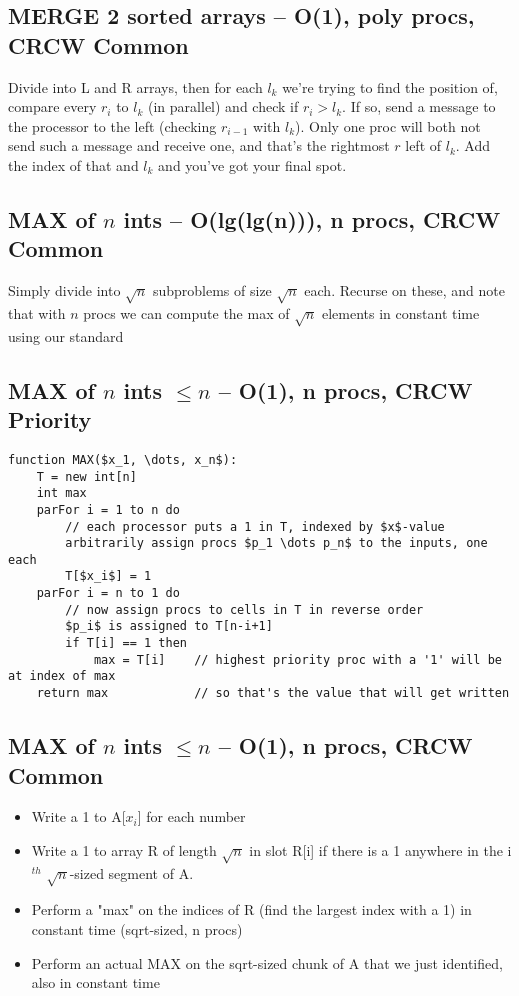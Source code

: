 \documentclass[12pt]{article}
\begin{document}
\subsection{MERGE 2 sorted arrays -- O(1), poly procs, CRCW Common}
Divide into L and R arrays, then for each $l_k$ we're trying to find the position of,
compare every $r_i$ to $l_k$ (in parallel) and check if $r_i > l_k$. If so, send a message
to the processor to the left (checking $r_{i-1}$ with $l_k$). Only one proc will both not send
such a message and receive one, and that's the rightmost $r$ left of $l_k$. Add the index of that
and $l_k$ and you've got your final spot.


\subsection{MAX of $n$ ints -- O(lg(lg(n))), n procs, CRCW Common}
Simply divide into $\sqrt{n}$ subproblems of size $\sqrt{n}$ each. Recurse on these, and note that with $n$ procs
we can compute the max of $\sqrt{n}$ elements in constant time using our standard

\subsection{MAX of $n$ ints $\leq n$ -- O(1), n procs, CRCW Priority}
\begin{lstlisting}
function MAX($x_1, \dots, x_n$):
    T = new int[n]
    int max
    parFor i = 1 to n do
        // each processor puts a 1 in T, indexed by $x$-value
        arbitrarily assign procs $p_1 \dots p_n$ to the inputs, one each
        T[$x_i$] = 1
    parFor i = n to 1 do
        // now assign procs to cells in T in reverse order
        $p_i$ is assigned to T[n-i+1]
        if T[i] == 1 then
            max = T[i]    // highest priority proc with a '1' will be at index of max
    return max            // so that's the value that will get written
\end{lstlisting}

\subsection{MAX of $n$ ints $\leq n$ -- O(1), n procs, CRCW Common}
\begin{itemize}
  \item Write a 1 to A[$x_i$] for each number
  \item Write a 1 to array R of length $\sqrt{n}$ in slot R[i] if there is a 1 anywhere in the i$^{th}$ $\sqrt{n}$-sized segment of A.
  \item Perform a "max" on the indices of R (find the largest index with a 1) in constant time (sqrt-sized, n procs)
  \item Perform an actual MAX on the sqrt-sized chunk of A that we just identified, also in constant time
\end{itemize}
\end{document}
